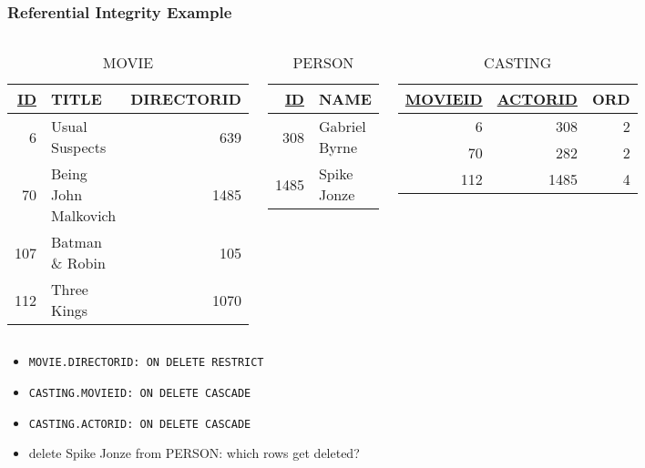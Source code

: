 \documentclass[dvipsnames]{beamer}
\theoremstyle{plain}
\begin{document}
\begin{frame}
  \frametitle{Referential Integrity Example}

  \begin{columns}[t]
    \begin{tiny}
    \begin{table}
      \caption{MOVIE}
      \begin{tabular}{|r|l|r|}\hline
\underline{ID} & TITLE             & DIRECTORID\\[2pt]\hline\hline
          6 & Usual Suspects       &        639\\\hline
         70 & Being John Malkovich &       1485\\\hline
        107 & Batman \& Robin      &        105\\\hline
        112 & Three Kings          &       1070\\\hline
      \end{tabular}
    \end{table}
    \end{tiny}

    \begin{tiny}
    \begin{table}
      \caption{PERSON}
      \begin{tabular}{|r|l|}\hline
\underline{ID} & NAME\\[2pt]\hline\hline
           308 & Gabriel Byrne\\\hline
          1485 & Spike Jonze  \\\hline
      \end{tabular}
    \end{table}
    \end{tiny}

    \begin{tiny}
    \begin{table}
      \caption{CASTING}
      \begin{tabular}{|r|r|r|}\hline
\underline{MOVIEID} & \underline{ACTORID} & ORD\\[2pt]\hline\hline
                  6 &                 308 &   2\\\hline
                 70 &                 282 &   2\\\hline
                112 &                1485 &   4\\\hline
      \end{tabular}
    \end{table}
    \end{tiny}
  \end{columns}

  \begin{itemize}
    \item \lstinline!MOVIE.DIRECTORID: ON DELETE RESTRICT!
    \item \lstinline!CASTING.MOVIEID: ON DELETE CASCADE!
    \item \lstinline!CASTING.ACTORID: ON DELETE CASCADE!
    \smallskip
    \item delete Spike Jonze from PERSON: which rows get deleted?
  \end{itemize}
\end{frame}
\end{document}

